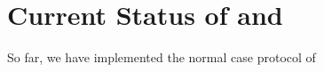 \section{Current Status of \xxx and \yyy} \label{sec:status}
So far, we have implemented the normal case protocol of \xxx 